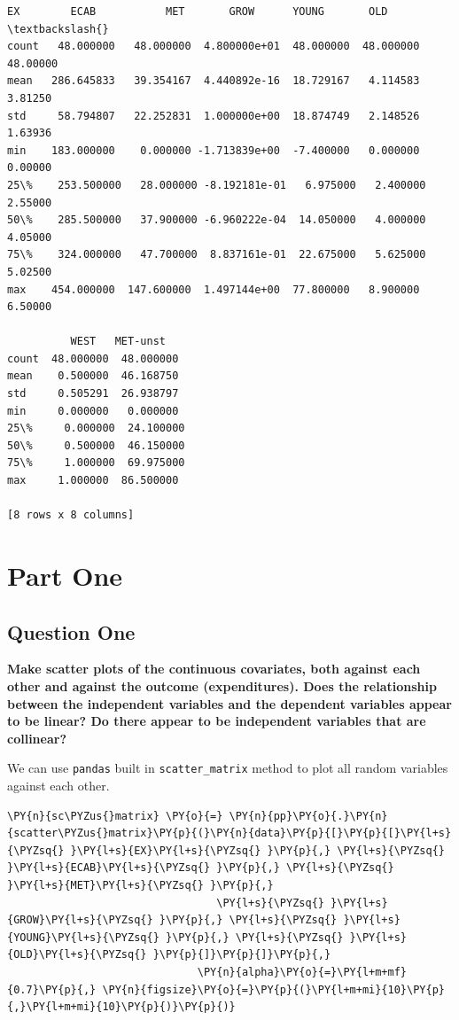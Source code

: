 \documentclass[10pt]{article}\usepackage[]{graphicx}\usepackage[]{xcolor}
\begin{document}
\newpage
            \begin{Verbatim}[commandchars=\\\{\}]
    EX        ECAB           MET       GROW      YOUNG       OLD  \textbackslash{}
count   48.000000   48.000000  4.800000e+01  48.000000  48.000000  48.00000   
mean   286.645833   39.354167  4.440892e-16  18.729167   4.114583   3.81250   
std     58.794807   22.252831  1.000000e+00  18.874749   2.148526   1.63936   
min    183.000000    0.000000 -1.713839e+00  -7.400000   0.000000   0.00000   
25\%    253.500000   28.000000 -8.192181e-01   6.975000   2.400000   2.55000   
50\%    285.500000   37.900000 -6.960222e-04  14.050000   4.000000   4.05000   
75\%    324.000000   47.700000  8.837161e-01  22.675000   5.625000   5.02500   
max    454.000000  147.600000  1.497144e+00  77.800000   8.900000   6.50000   

          WEST   MET-unst  
count  48.000000  48.000000  
mean    0.500000  46.168750  
std     0.505291  26.938797  
min     0.000000   0.000000  
25\%     0.000000  24.100000  
50\%     0.500000  46.150000  
75\%     1.000000  69.975000  
max     1.000000  86.500000  
          
[8 rows x 8 columns]
\end{Verbatim}
        
\newpage

\section*{Part One}
    \subsection*{Question One}
    \textbf{Make scatter plots of the continuous covariates, both against each other and against the outcome
    (expenditures).  Does the relationship between the independent variables and the dependent variables appear to be
    linear? Do there appear to be independent variables that are collinear?}\newline

    We can use \texttt{pandas} built in \texttt{scatter\_matrix} method to plot all random variables against each other.

    \begin{Verbatim}[commandchars=\\\{\}]
\PY{n}{sc\PYZus{}matrix} \PY{o}{=} \PY{n}{pp}\PY{o}{.}\PY{n}{scatter\PYZus{}matrix}\PY{p}{(}\PY{n}{data}\PY{p}{[}\PY{p}{[}\PY{l+s}{\PYZsq{} }\PY{l+s}{EX}\PY{l+s}{\PYZsq{} }\PY{p}{,} \PY{l+s}{\PYZsq{} }\PY{l+s}{ECAB}\PY{l+s}{\PYZsq{} }\PY{p}{,} \PY{l+s}{\PYZsq{} }\PY{l+s}{MET}\PY{l+s}{\PYZsq{} }\PY{p}{,}
                                 \PY{l+s}{\PYZsq{} }\PY{l+s}{GROW}\PY{l+s}{\PYZsq{} }\PY{p}{,} \PY{l+s}{\PYZsq{} }\PY{l+s}{YOUNG}\PY{l+s}{\PYZsq{} }\PY{p}{,} \PY{l+s}{\PYZsq{} }\PY{l+s}{OLD}\PY{l+s}{\PYZsq{} }\PY{p}{]}\PY{p}{]}\PY{p}{,}
                              \PY{n}{alpha}\PY{o}{=}\PY{l+m+mf}{0.7}\PY{p}{,} \PY{n}{figsize}\PY{o}{=}\PY{p}{(}\PY{l+m+mi}{10}\PY{p}{,}\PY{l+m+mi}{10}\PY{p}{)}\PY{p}{)}
    \end{Verbatim}
\end{document}
